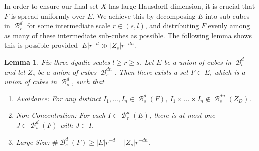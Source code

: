 \documentclass[dvipsnames,letterpaper,12pt]{article}
\theoremstyle{plain}
\newtheorem{lemma}{Lemma}
\DeclareMathOperator{\B}{\mathcal{B}}
\begin{document}
In order to ensure our final set $X$ has large Hausdorff dimension, it is crucial that $F$ is spread uniformly over $E$. We achieve this by decomposing $E$ into sub-cubes in $\B_r^d$ for some intermediate scale $r \in (s,l)$, and distributing $F$ evenly among as many of these intermediate sub-cubes as possible. The following lemma shows this is possible provided $|E| r^{-d} \gg |Z_s|r^{-dn}$.


\begin{lemma} \label{discretelemma}
	Fix three dyadic scales $l \geq r \geq s$. Let $E$ be a union of cubes in $\B_l^d$ and let $Z_s$ be a union of cubes $\B_s^{dn}$. Then there exists a set $F \subset E$, which is a union of cubes in $\B_s^d$, such that
	\begin{enumerate}
		\item[\emph{(a)}] \emph{Avoidance}: For any distinct $I_1, \dots, I_n \in \B^d_s(F)$, $I_1 \times \dots \times I_n \not \in \B_s^{dn}(Z_D)$.
		\item[\emph{(b)}] \emph{Non-Concentration}: For each $I \in \B_r^d(E)$, there is at most one $J \in \B_s^d(F)$ with $J \subset I$.
		\item[\emph{(c)}] \emph{Large Size}: $\# \B_s^d(F) \geq |E| r^{-d} - |Z_s| r^{-dn}$.
	\end{enumerate}
\end{lemma}
\end{document}
